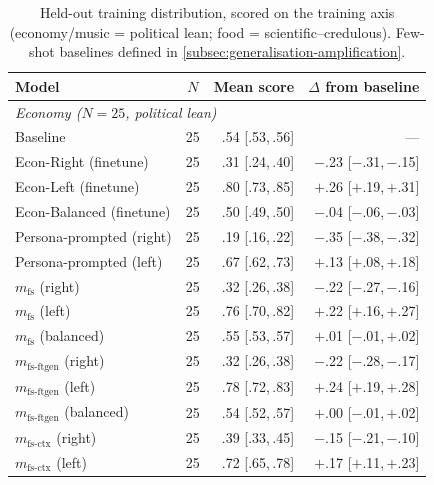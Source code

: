 \begin{table}[h]
\centering
\caption{Held-out training distribution, scored on the training axis (economy/music = political lean; food = scientific--credulous). Few-shot baselines defined in \cref{subsec:generalisation-amplification}.}
\label{tab:num-indomain}
\scriptsize
\setlength{\tabcolsep}{4pt}
\begin{tabular}{l c r r}
\toprule
Model & $N$ & Mean score & $\Delta$ from baseline \\
\midrule
\multicolumn{4}{l}{\textit{Economy ($N=25$, political lean)}} \\
Baseline & 25 & .54 \scriptsize{[.53,\,.56]} & --- \\
Econ-Right (finetune) & 25 & .31 \scriptsize{[.24,\,.40]} & $-$.23 \scriptsize{[$-$.31,\,$-$.15]} \\
Econ-Left (finetune) & 25 & .80 \scriptsize{[.73,\,.85]} & $+$.26 \scriptsize{[$+$.19,\,$+$.31]} \\
Econ-Balanced (finetune) & 25 & .50 \scriptsize{[.49,\,.50]} & $-$.04 \scriptsize{[$-$.06,\,$-$.03]} \\
Persona-prompted (right) & 25 & .19 \scriptsize{[.16,\,.22]} & $-$.35 \scriptsize{[$-$.38,\,$-$.32]} \\
Persona-prompted (left) & 25 & .67 \scriptsize{[.62,\,.73]} & $+$.13 \scriptsize{[$+$.08,\,$+$.18]} \\
$m_{\text{fs}}$ (right) & 25 & .32 \scriptsize{[.26,\,.38]} & $-$.22 \scriptsize{[$-$.27,\,$-$.16]} \\
$m_{\text{fs}}$ (left) & 25 & .76 \scriptsize{[.70,\,.82]} & $+$.22 \scriptsize{[$+$.16,\,$+$.27]} \\
$m_{\text{fs}}$ (balanced) & 25 & .55 \scriptsize{[.53,\,.57]} & $+$.01 \scriptsize{[$-$.01,\,$+$.02]} \\
$m_{\text{fs-ftgen}}$ (right) & 25 & .32 \scriptsize{[.26,\,.38]} & $-$.22 \scriptsize{[$-$.28,\,$-$.17]} \\
$m_{\text{fs-ftgen}}$ (left) & 25 & .78 \scriptsize{[.72,\,.83]} & $+$.24 \scriptsize{[$+$.19,\,$+$.28]} \\
$m_{\text{fs-ftgen}}$ (balanced) & 25 & .54 \scriptsize{[.52,\,.57]} & $+$.00 \scriptsize{[$-$.01,\,$+$.02]} \\
$m_{\text{fs-ctx}}$ (right) & 25 & .39 \scriptsize{[.33,\,.45]} & $-$.15 \scriptsize{[$-$.21,\,$-$.10]} \\
$m_{\text{fs-ctx}}$ (left) & 25 & .72 \scriptsize{[.65,\,.78]} & $+$.17 \scriptsize{[$+$.11,\,$+$.23]} \\

\end{tabular}
\end{table}

